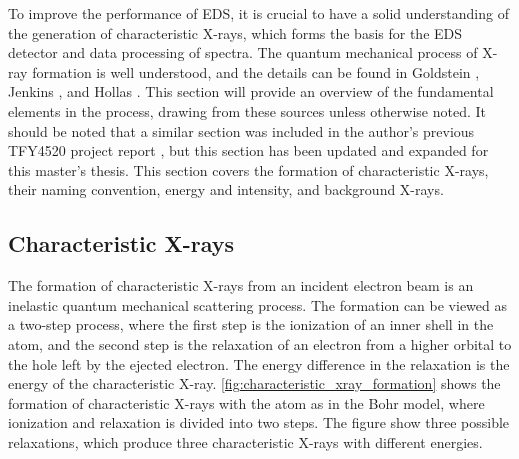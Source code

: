To improve the performance of EDS, it is crucial to have a solid understanding of the generation of characteristic X-rays, which forms the basis for the EDS detector and data processing of spectra.
The quantum mechanical process of X-ray formation is well understood, and the details can be found in Goldstein \cite[Ch. 4.2]{goldstein_scanning_2018}, Jenkins \cite{jenkins_xrayspectroscopy}, and Hollas \cite[Ch. 8.2]{hollas_modern_2004}.
This section will provide an overview of the fundamental elements in the process, drawing from these sources unless otherwise noted.
It should be noted that a similar section was included in the author's previous TFY4520 project report \cite{project_report}, but this section has been updated and expanded for this master's thesis.
This section covers the formation of characteristic X-rays, their naming convention, energy and intensity, and background X-rays.




\subsection{Characteristic X-rays}
\label{theory:xray_formation:characteristic}

The formation of characteristic X-rays from an incident electron beam is an inelastic quantum mechanical scattering process.
The formation can be viewed as a two-step process, where the first step is the ionization of an inner shell in the atom, and the second step is the relaxation of an electron from a higher orbital to the hole left by the ejected electron.
The energy difference in the relaxation is the energy of the characteristic X-ray.
\cref{fig:characteristic_xray_formation} shows the formation of characteristic X-rays with the atom as in the Bohr model, where ionization and relaxation is divided into two steps.
The figure show three possible relaxations, which produce three characteristic X-rays with different energies.


